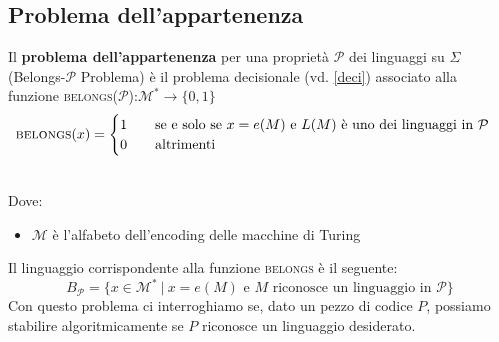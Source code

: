 \subsection{Problema dell'appartenenza}
\colorbox{SALZO}{\parbox{\dimexpr\linewidth-2\fboxsep}{\begin{definition}
   Il \textbf{problema dell'appartenenza} per una proprietà $\mathcal{P}$ dei linguaggi su $\Sigma$
   (Belongs-$\mathcal{P}$ Problema) è il problema decisionale (vd. \ref{deci}) associato alla funzione \textsc{belongs}($\mathcal{P}$):$\mathcal{M}^*\to \{0,1\}$
   \[  \textsc{belongs}(x) = \begin{cases}
    1 \qquad \text{se e solo se } x = e(M) \text{ e } L(M) \text{ è uno dei linguaggi in } \mathcal{P}\\
    0 \qquad \text{altrimenti}
   \end{cases} \]
\end{definition}}}\smallskip\\
Dove:
\begin{itemize}
    \item $\mathcal{M}$ è l'alfabeto dell'encoding delle macchine di Turing 
\end{itemize}
Il linguaggio corrispondente alla funzione \textsc{belongs} è il seguente:
\[   B_{\mathcal{P}} = \{   x \in \mathcal{M}^* \ | \ x = e(M) \text{ e } M \text{ riconosce un linguaggio in } \mathcal{P} \}  \]
Con questo problema ci interroghiamo se, dato un pezzo di codice $P$, possiamo stabilire algoritmicamente se $P$ riconosce un linguaggio desiderato.



